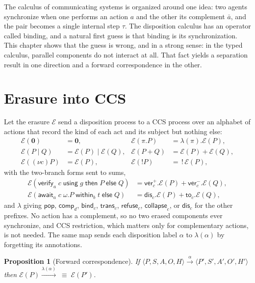 \documentclass[11pt,openany]{book}
\newtheorem{proposition}[theorem]{Proposition}
\theoremstyle{remark}
\begin{document}
The calculus of communicating systems is organized around one idea: two
agents synchronize when one performs an action $a$ and the other its
complement $\bar a$, and the pair becomes a single internal step $\tau$.
The disposition calculus has an operator called binding, and a natural
first guess is that binding is its synchronization. This chapter shows
that the guess is wrong, and in a strong sense: in the typed calculus,
parallel components do not interact at all. That fact yields a separation
result in one direction and a forward correspondence in the other.

\section{Erasure into CCS}

Let the erasure $\mathcal E$ send a disposition process to a CCS process
over an alphabet of actions that record the kind of each act and its
subject but nothing else:
\[
\begin{aligned}
\mathcal E(\mathbf 0)&=\mathbf 0, &
\mathcal E(\pi.P)&=\lambda(\pi).\mathcal E(P),\\
\mathcal E(P\mid Q)&=\mathcal E(P)\mid\mathcal E(Q), &
\mathcal E(P+Q)&=\mathcal E(P)+\mathcal E(Q),\\
\mathcal E((\nu c)P)&=\mathcal E(P), &
\mathcal E(!P)&=\,!\,\mathcal E(P),
\end{aligned}
\]
with the two-branch forms sent to sums,
\[
\begin{aligned}
\mathcal E(\mathsf{verify}_a\;c\;\mathsf{using}\;g\;\mathsf{then}\;P\;\mathsf{else}\;Q)
&=\mathsf{ver}^{+}_c.\mathcal E(P)+\mathsf{ver}^{-}_c.\mathcal E(Q),\\
\mathcal E(\mathsf{await}_a\;c\;\omega.P\;\mathsf{within}_b\;t\;\mathsf{else}\;Q)
&=\mathsf{dis}_c.\mathcal E(P)+\mathsf{to}_c.\mathcal E(Q),
\end{aligned}
\]
and $\lambda$ giving $\mathsf{pop}$, $\mathsf{comp}_d$, $\mathsf{bind}_c$,
$\mathsf{trans}_c$, $\mathsf{refuse}_c$, $\mathsf{collapse}_c$, or
$\mathsf{dis}_c$ for the other prefixes. No action has a complement, so no
two erased components ever synchronize, and CCS restriction, which matters
only for complementary actions, is not needed. The same map sends each
disposition label $\alpha$ to $\lambda(\alpha)$ by forgetting its
annotations.

\begin{proposition}[Forward correspondence]\label{prop:ccsfwd}
If $\langle P,S,A,O,H\rangle\xrightarrow{\alpha}\langle P',S',A',O',H'\rangle$
then $\mathcal E(P)\xrightarrow{\lambda(\alpha)}\;\equiv\;\mathcal E(P')$.
\end{proposition}
\end{document}
